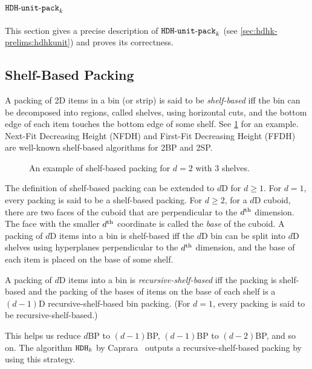 \section{\texorpdfstring{$\operatorname{\mathtt{HDH-unit-pack}}_k$}{HDH-unit-pack}}
\label{sec:hdhkunit}

This section gives a precise description of $\operatorname{\mathtt{HDH-unit-pack}}_k$ (see \cref{sec:hdhk-prelims:hdhkunit})
and proves its correctness.

\subsection{Shelf-Based Packing}
\label{sec:shelf}

A packing of 2D items in a bin (or strip) is said to be \emph{shelf-based} iff
the bin can be decomposed into regions, called shelves, using horizontal cuts,
and the bottom edge of each item touches the bottom edge of some shelf.
See \cref{fig:shelf-based} for an example.
Next-Fit Decreasing Height (NFDH) and First-Fit Decreasing Height (FFDH)%
~\cite{coffman1980performance} are well-known shelf-based algorithms for 2BP and 2SP.

\begin{figure}[!ht]
\centering

\caption{An example of shelf-based packing for $d=2$ with 3 shelves.}
\label{fig:shelf-based}
\end{figure}

The definition of shelf-based packing can be extended to $d$D for $d \ge 1$.
For $d=1$, every packing is said to be a shelf-based packing.
For $d \ge 2$, for a $d$D cuboid, there are two faces of the cuboid that are
perpendicular to the $d^{\textrm{th}}$ dimension. The face with the smaller $d^{\textrm{th}}$ coordinate
is called the \emph{base} of the cuboid.
A packing of $d$D items into a bin is shelf-based iff the $d$D bin
can be split into $d$D shelves using hyperplanes perpendicular to the $d^{\textrm{th}}$ dimension,
and the base of each item is placed on the base of some shelf.

A packing of $d$D items into a bin is \emph{recursive-shelf-based} iff
the packing is shelf-based and the packing of the bases of items on the base of each shelf
is a $(d-1)$D recursive-shelf-based bin packing.
(For $d=1$, every packing is said to be recursive-shelf-based.)

This helps us reduce $d$BP to $(d-1)$BP, $(d-1)$BP to $(d-2)$BP, and so on.
The algorithm $\operatorname{\mathtt{HDH}}_{k}$ by Caprara~\cite{caprara2008}
outputs a recursive-shelf-based packing by using this strategy.

